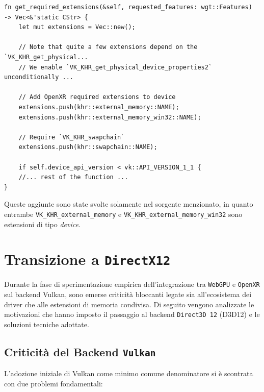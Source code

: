 \documentclass[a4paper, 11pt, twoside]{report}
\begin{document}
\begin{listing}[!ht]
\begin{verbatim}
fn get_required_extensions(&self, requested_features: wgt::Features) 
-> Vec<&'static CStr> {
    let mut extensions = Vec::new();

    // Note that quite a few extensions depend on the `VK_KHR_get_physical...
    // We enable `VK_KHR_get_physical_device_properties2` unconditionally ...

    // Add OpenXR required extensions to device
    extensions.push(khr::external_memory::NAME);
    extensions.push(khr::external_memory_win32::NAME);

    // Require `VK_KHR_swapchain`
    extensions.push(khr::swapchain::NAME);

    if self.device_api_version < vk::API_VERSION_1_1 {
    //... rest of the function ...
}
\end{verbatim}
\vspace{-0.75cm}
\caption{Abilitazione estensioni di \texttt{\gls{Vulkan}}}
\label{listing:vkext}
\end{listing}

Queste aggiunte sono state svolte solamente nel sorgente menzionato, in quanto entrambe
\texttt{VK\_KHR\_external\_memory} e \texttt{VK\_KHR\_external\_memory\_win32} sono estensioni di tipo \textit{device}.

\section{Transizione a \texttt{\gls{DirectX}12}}

Durante la fase di sperimentazione empirica dell'integrazione tra \texttt{WebGPU} e \texttt{\gls{OpenXR}} sul backend
\gls{Vulkan}, sono emerse criticità bloccanti legate sia all'ecosistema dei driver che alle estensioni di memoria
condivisa. Di seguito vengono analizzate le motivazioni che hanno imposto il passaggio al backend \texttt{Direct3D 12}
(D3D12) e le soluzioni tecniche adottate.

\subsection{Criticità del Backend \texttt{\gls{Vulkan}}}

L'adozione iniziale di \gls{Vulkan} come minimo comune denominatore si è scontrata con due problemi fondamentali:
\end{document}
